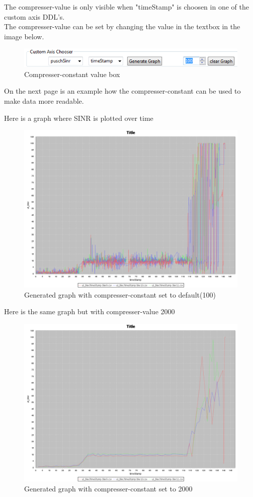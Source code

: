 \documentclass[cropmarks, frame, english]{idamasterthesis}
\begin{document}
The compresser-value is only visible when "timeStamp" is choosen in one of the custom axis DDL's.\\

The compresser-value can be set by changing the value in the textbox in the image below.
\begin{figure}[H]
\includegraphics[scale=0.7]{AdvancedView_TimeConstant_Marked}
\centering
\caption{Compresser-constant value box}
\end{figure}

On the next page is an example how the compresser-constant can be used to make data more readable.
\newpage

Here is a graph where SINR is plotted over time
\begin{figure}[H]
\includegraphics[scale=0.25]{AdvancedView_bler_over_100}
\centering
\caption{Generated graph with compresser-constant set to default(100)}
\end{figure}

Here is the same graph but with compresser-value 2000
\begin{figure}[H]
\includegraphics[scale=0.25]{AdvancedView_bler_over_2000}
\centering
\caption{Generated graph with compresser-constant set to 2000}
\end{figure}
\end{document}
